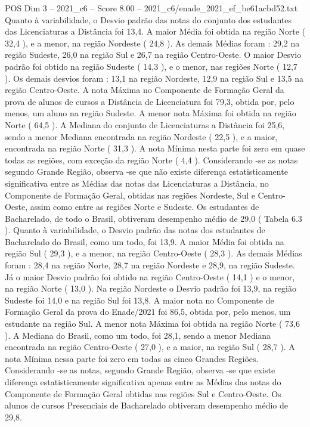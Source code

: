 \begin{textsample}{POS Dim 3 – 2021\_c6 – Score 8.00 – 2021\_c6/enade\_2021\_ef\_be61acbd52.txt}
Quanto à variabilidade, o Desvio padrão das notas do conjunto dos estudantes das Licenciaturas a Distância foi 13,4.
A maior Média foi obtida na região Norte ( 32,4 ), e a menor, na região Nordeste ( 24,8 ).
As demais Médias foram : 29,2 na região Sudeste, 26,0 na região Sul e 26,7 na região Centro-Oeste.
O maior Desvio padrão foi obtido na região Sudeste ( 14,3 ), e o menor, nas regiões Norte ( 12,7 ).
Os demais desvios foram : 13,1 na região Nordeste, 12,9 na região Sul e 13,5 na região Centro-Oeste.
A nota Máxima no Componente de Formação Geral da prova de alunos de cursos a Distância de Licenciatura foi 79,3, obtida por, pelo menos, um aluno na região Sudeste.
A menor nota Máxima foi obtida na região Norte ( 64,5 ).
A Mediana do conjunto de Licenciaturas a Distância foi 25,6, sendo a menor Mediana encontrada na região Nordeste ( 22,5 ), e a maior, encontrada na região Norte ( 31,3 ).
A nota Mínima nesta parte foi zero em quase todas as regiões, com exceção da região Norte ( 4,4 ).
Considerando -se as notas segundo Grande Região, observa -se que não existe diferença estatisticamente significativa entre as Médias das notas das Licenciaturas a Distância, no Componente de Formação Geral, obtidas nas regiões Nordeste, Sul e Centro-Oeste, assim como entre as regiões Norte e Sudeste.
Os estudantes de Bacharelado, de todo o Brasil, obtiveram desempenho médio de 29,0 ( Tabela 6.3 ).
Quanto à variabilidade, o Desvio padrão das notas dos estudantes de Bacharelado do Brasil, como um todo, foi 13,9.
A maior Média foi obtida na região Sul ( 29,3 ), e a menor, na região Centro-Oeste ( 28,3 ).
As demais Médias foram : 28,4 na região Norte, 28,7 na região Nordeste e 28,9, na região Sudeste.
Já o maior Desvio padrão foi obtido na região Centro-Oeste ( 14,1 ) e o menor, na região Norte ( 13,0 ).
Na região Nordeste o Desvio padrão foi 13,9, na região Sudeste foi 14,0 e na região Sul foi 13,8.
A maior nota no Componente de Formação Geral da prova do Enade/2021 foi 86,5, obtida por, pelo menos, um estudante na região Sul.
A menor nota Máxima foi obtida na região Norte ( 73,6 ).
A Mediana do Brasil, como um todo, foi 28,1, sendo a menor Mediana encontrada na região Centro-Oeste ( 27,0 ), e a maior, na região Sul ( 28,7 ).
A nota Mínima nessa parte foi zero em todas as cinco Grandes Regiões.
Considerando -se as notas, segundo Grande Região, observa -se que existe diferença estatisticamente significativa apenas entre as Médias das notas do Componente de Formação Geral obtidas nas regiões Sul e Centro-Oeste.
Os alunos de cursos Presenciais de Bacharelado obtiveram desempenho médio de 29,8.

\end{textsample}

